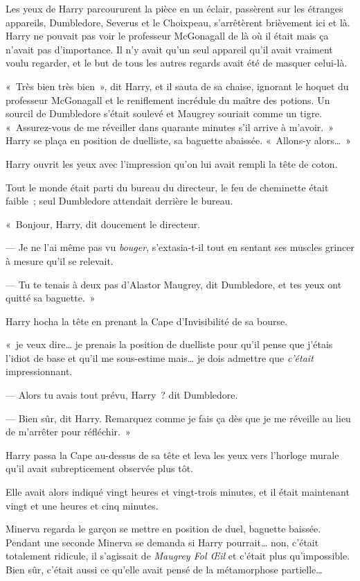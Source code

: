 Les yeux de Harry parcoururent la pièce en un éclair, passèrent sur les étranges appareils, Dumbledore, Severus et le Choixpeau, s'arrêtèrent brièvement ici et là.
Harry ne pouvait pas voir le professeur McGonagall de là où il était mais ça n'avait pas d'importance.
Il n'y avait qu'un seul appareil qu'il avait vraiment voulu regarder, et le but de tous les autres regards avait été de masquer celui-là.

«~Très bien très bien~», dit Harry, et il sauta de sa chaise, ignorant le hoquet du professeur McGonagall et le reniflement incrédule du maître des potions.
Un sourcil de Dumbledore s'était soulevé et Maugrey souriait comme un tigre.
«~Assurez-vous de me réveiller dans quarante minutes s'il arrive à m'avoir.~»
Harry se plaça en position de duelliste, sa baguette abaissée.
«~Allons-y alors…~»

\later

Harry ouvrit les yeux avec l'impression qu'on lui avait rempli la tête de coton.

Tout le monde était parti du bureau du directeur, le feu de cheminette était faible~; seul Dumbledore attendait derrière le bureau.

«~Bonjour, Harry, dit doucement le directeur.

--- Je ne l'ai même pas vu \emph{bouger}, s'extasia-t-il tout en sentant ses muscles grincer à mesure qu'il se relevait.

--- Tu te tenais à deux pas d'Alastor Maugrey, dit Dumbledore, et tes yeux ont quitté sa baguette.~»

Harry hocha la tête en prenant la Cape d'Invisibilité de sa bourse.

«~je veux dire… je prenais la position de duelliste pour qu'il pense que j'étais l'idiot de base et qu'il me sous-estime mais… je dois admettre que \emph{c'était} impressionnant.

--- Alors tu avais tout prévu, Harry~? dit Dumbledore.

--- Bien sûr, dit Harry.
Remarquez comme je fais ça dès que je me réveille au lieu de m'arrêter pour réfléchir.~»

Harry passa la Cape au-dessus de sa tête et leva les yeux vers l'horloge murale qu'il avait subrepticement observée plus tôt.

Elle avait alors indiqué vingt heures et vingt-trois minutes, et il était maintenant vingt et une heures et cinq minutes.

\later

Minerva regarda le garçon se mettre en position de duel, baguette baissée.
Pendant une seconde Minerva se demanda si Harry pourrait… non, c'était totalement ridicule, il s'agissait de \emph{Maugrey Fol Œil} et c'était plus qu'impossible.
Bien sûr, c'était aussi ce qu'elle avait pensé de la métamorphose partielle…


